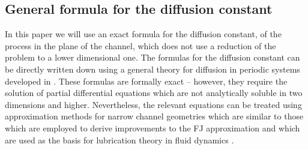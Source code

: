 \documentclass[pre,showpacs,preprintnumbers,amsmath,amssymb,superscriptaddress]{revtex4-1}
\begin{document}
\subsection{General formula for the diffusion constant}
In this paper we will use an exact formula for the diffusion constant, of the process in the plane of the channel, which
does not use a reduction of the problem to a lower dimensional one. The formulas for the diffusion constant can be 
directly written down using a general theory for diffusion in periodic systems developed in \cite{gue2015a,gue2015b}.
These formulas are formally exact -- however, they require the solution of partial differential equations which are
not analytically soluble in two dimensions and higher. Nevertheless, the relevant equations can be treated using approximation methods for narrow channel geometries which are similar to those which are employed to derive improvements to the 
FJ approximation and which are used as the basis for lubrication theory in fluid dynamics \cite{lub}. 
\end{document}
